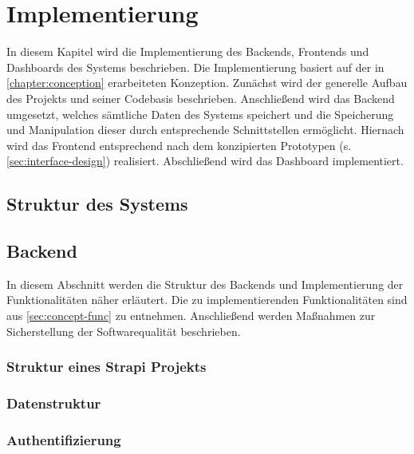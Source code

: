 \chapter{Implementierung}

In diesem Kapitel wird die Implementierung des Backends, Frontends und
Dashboards des Systems beschrieben. Die Implementierung basiert auf der in
\autoref{chapter:conception} erarbeiteten Konzeption. Zunächst wird der
generelle Aufbau des Projekts und seiner Codebasis beschrieben. Anschließend
wird das Backend umgesetzt, welches sämtliche Daten des Systems speichert und
die Speicherung und Manipulation dieser durch entsprechende Schnittstellen
ermöglicht. Hiernach wird das Frontend entsprechend nach dem konzipierten
Prototypen (s. \autoref{sec:interface-design}) realisiert. Abschließend wird das
Dashboard implementiert.

\section{Struktur des Systems}







\section{Backend}

In diesem Abschnitt werden die Struktur des Backends und Implementierung der
Funktionalitäten näher erläutert. Die zu implementierenden Funktionalitäten sind
aus \autoref{sec:concept-func} zu entnehmen. Anschließend werden Maßnahmen zur Sicherstellung der Softwarequalität beschrieben.

\subsection{Struktur eines Strapi Projekts}



\subsection{Datenstruktur}

\subsection{Authentifizierung}

